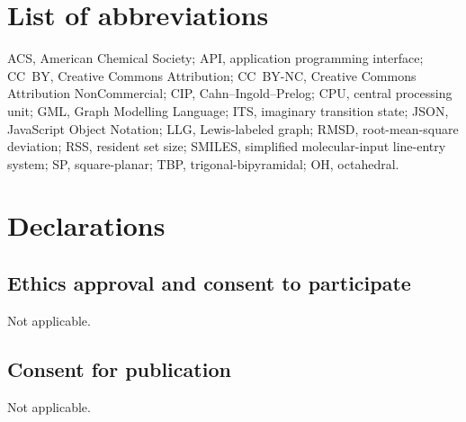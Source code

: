 \documentclass[pdflatex,sn-mathphys-num,referee,lineno]{sn-jnl}
\theoremstyle{plain}
\theoremstyle{remark}
\theoremstyle{definition}
\begin{document}
\section*{List of abbreviations}
ACS, American Chemical Society; API, application programming interface;
CC~BY, Creative Commons Attribution; CC~BY-NC, Creative Commons Attribution
NonCommercial; CIP, Cahn--Ingold--Prelog; CPU, central processing unit;
GML, Graph Modelling Language; ITS, imaginary transition state;
JSON, JavaScript Object Notation; LLG, Lewis-labeled graph;
RMSD, root-mean-square deviation; RSS, resident set size;
SMILES, simplified molecular-input line-entry system;
SP, square-planar; TBP, trigonal-bipyramidal; OH, octahedral.

\section*{Declarations}

\subsection*{Ethics approval and consent to participate}
Not applicable.

\subsection*{Consent for publication}
Not applicable.
\end{document}
